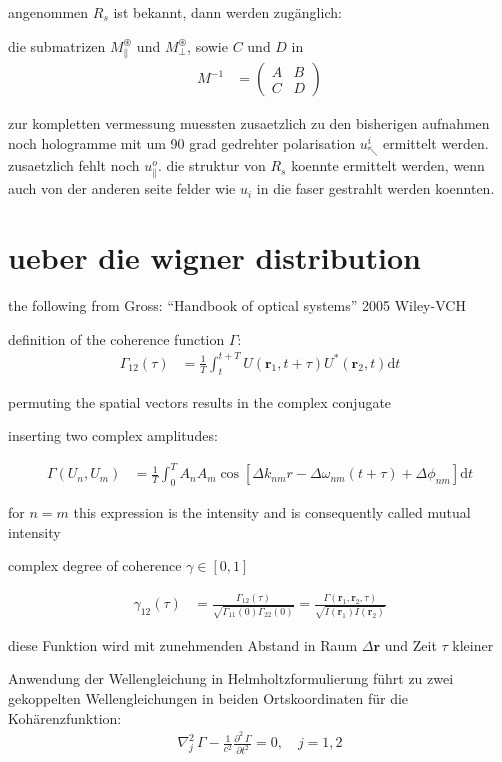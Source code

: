 \documentclass{article}
\newcommand{\vect}[1]{\mathbf{#1}}
\renewcommand{\r}{\vect r}
\begin{document}
angenommen $R_s$ ist bekannt, dann werden zug\"anglich: 

die submatrizen $M^\circledast_\parallel$ und $M^\circledast_\perp$,
sowie $C$ und $D$ in
\begin{align}
  M^{-1} &=\begin{pmatrix}
    A & B \\ C& D
  \end{pmatrix}
\end{align}


zur kompletten vermessung muessten zusaetzlich zu den bisherigen
aufnahmen noch hologramme mit um 90 grad gedrehter polarisation
$u^i_\nwarrow$ ermittelt werden. zusaetzlich fehlt noch
$u^o_\parallel$. die struktur von $R_s$ koennte ermittelt werden, wenn
auch von der anderen seite felder wie $u_i$ in die faser gestrahlt
werden koennten.

\section{ueber die wigner distribution}
the following from Gross: ``Handbook of optical systems'' 2005 Wiley-VCH

definition of the coherence function $\Gamma$:
\begin{align}
  \Gamma_{12}(\tau) &= \frac{1}{T}\int_t^{t+T} U(\r_1,t+\tau) U^*(\r_2,t)\textrm{d}t
\end{align}

permuting the spatial vectors results in the complex conjugate

inserting two complex amplitudes:

\begin{align}
  \Gamma(U_n, U_m) &= \frac{1}{T}\int_0^T A_n A_m \cos\left[ \Delta k_{nm} r -\Delta\omega_{nm}(t+\tau) + \Delta\phi_{nm} \right]\textrm{d}t
\end{align}

for $n=m$ this expression is the intensity and is consequently called mutual intensity

complex degree of coherence $\gamma\in[0,1]$

\begin{align}
  \gamma_{12}(\tau) &= \frac{\Gamma_{12}(\tau)}{\sqrt{\Gamma_{11}(0)\Gamma_{22}(0)}} = \frac{\Gamma(\r_1,\r_2,\tau)}{\sqrt{I(\r_1)I(\r_2)}}
\end{align}

diese Funktion wird mit zunehmenden Abstand in Raum $\Delta\r$ und Zeit $\tau$ kleiner

Anwendung der Wellengleichung in Helmholtzformulierung f\"uhrt zu zwei
gekoppelten Wellengleichungen in beiden Ortskoordinaten f\"ur die
Koh\"arenzfunktion:
\begin{align}
  \nabla_j^2\,\Gamma - \frac{1}{c^2} \frac{\partial^2\, \Gamma}{\partial t^2} = 0, \quad j=1,2
\end{align}
\end{document}
